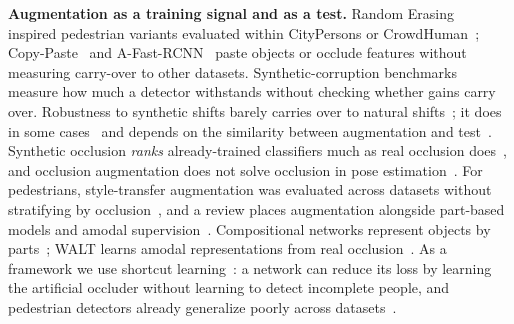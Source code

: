 \documentclass[conference]{IEEEtran}
\begin{document}
\textbf{Augmentation as a training signal and as a test.} Random Erasing~\cite{Zhong2020} inspired pedestrian variants evaluated within CityPersons or CrowdHuman~\cite{Shang2018synthocc,Chi2020pedhunter}; Copy-Paste~\cite{Ghiasi2021copypaste} and A-Fast-RCNN~\cite{Wang2017afast} paste objects or occlude features without measuring carry-over to other datasets. Synthetic-corruption benchmarks~\cite{Michaelis2019winter} measure how much a detector withstands without checking whether gains carry over. Robustness to synthetic shifts barely carries over to natural shifts~\cite{Taori2020shifts}; it does in some cases~\cite{Hendrycks2021manyfaces} and depends on the similarity between augmentation and test~\cite{Mintun2021interaction}. Synthetic occlusion \emph{ranks} already-trained classifiers much as real occlusion does~\cite{Kassaw2026occl}, and occlusion augmentation does not solve occlusion in pose estimation~\cite{Pytel2021tilting}. For pedestrians, style-transfer augmentation was evaluated across datasets without stratifying by occlusion~\cite{Cygert2020robust}, and a review places augmentation alongside part-based models and amodal supervision~\cite{Saleh2021occlusion}. Compositional networks represent objects by parts~\cite{Kortylewski2020compnet,Wang2020compnet}; WALT learns amodal representations from real occlusion~\cite{Reddy2022walt}. As a framework we use shortcut learning~\cite{Geirhos2020shortcut}: a network can reduce its loss by learning the artificial occluder without learning to detect incomplete people, and pedestrian detectors already generalize poorly across datasets~\cite{Hasan2021elephant,Sukesh2024camped}.
\end{document}
